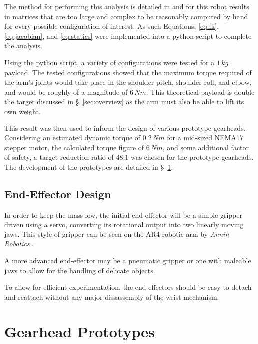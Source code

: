 \documentclass[a4paper,11pt]{article}
\begin{document}
The method for performing this analysis is detailed in \cite[\S~5]{modernrobotics} and for this robot results in matrices that are too large and complex to be reasonably computed by hand for every possible configuration of interest. As such Equations, \ref{eq:fk}, \ref{eq:jacobian}, and \ref{eq:statics} were implemented into a python script to complete the analysis.

Using the python script, a variety of configurations were tested for a $1\,\si{kg}$ payload. The tested configurations showed that the maximum torque required of the arm's joints would take place in the shoulder pitch, shoulder roll, and elbow, and would be roughly of a magnitude of $6\,\si{N m}$. This theoretical payload is double the target discussed in \S~\ref{sec:overview} as the arm must also be able to lift its own weight.

This result was then used to inform the design of various prototype gearheads. Considering an estimated dynamic torque of $0.2\,\si{N m}$ for a mid-sized NEMA17 stepper motor, the calculated torque figure of $6\,\si{N m}$, and some additional factor of safety, a target reduction ratio of 48:1 was chosen for the prototype gearheads. The development of the prototypes are detailed in \S~\ref{sec:gearheads}.


\subsection{End-Effector Design}
In order to keep the mass low, the initial end-effector will be a simple gripper driven using a servo, converting its rotational output into two linearly moving jaws. This style of gripper can be seen on the AR4 robotic arm by \textit{Annin Robotics} \cite{ar4gripper}.

A more advanced end-effector may be a pneumatic gripper or one with maleable jaws to allow for the handling of delicate objects.

To allow for efficient experimentation, the end-effectors should be easy to detach and reattach without any major dissassembly of the wrist mechanism.

\newpage
\section{Gearhead Prototypes}\label{sec:gearheads}
\end{document}
